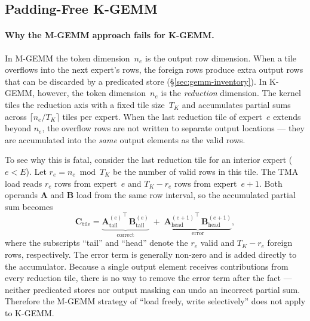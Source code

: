 \documentclass[11pt,a4paper]{article}
\theoremstyle{definition}
\begin{document}
\subsection{Padding-Free K-GEMM}

\paragraph{Why the M-GEMM approach fails for K-GEMM.}
In M-GEMM the token dimension~$n_e$ is the output row dimension.
When a tile overflows into the next expert's rows, the foreign rows
produce extra output rows that can be discarded by a predicated store
(\S\ref{sec:gemm-inventory}).
In K-GEMM, however, the token dimension~$n_e$ is the \emph{reduction}
dimension.
The kernel tiles the reduction axis with a fixed tile size~$T_K$ and
accumulates partial sums across $\lceil n_e / T_K \rceil$ tiles per
expert.
When the last reduction tile of expert~$e$ extends beyond $n_e$,
the overflow rows are not written to separate output locations --- they
are accumulated into the \emph{same} output elements as the valid rows.

To see why this is fatal, consider the last reduction tile for an
interior expert ($e < E$).
Let $r_e = n_e \bmod T_K$ be the number of valid rows in this tile.
The TMA load reads $r_e$ rows from expert~$e$ and $T_K - r_e$
rows from expert~$e{+}1$.
Both operands $\mathbf{A}$ and $\mathbf{B}$ load from the same
row interval, so the accumulated partial sum becomes
\begin{equation}
  \mathbf{C}_{\text{tile}} =
    \underbrace{{\mathbf{A}^{(e)}_{\text{tail}}}^{\!\top}
               \,\mathbf{B}^{(e)}_{\text{tail}}}_{\text{correct}}
    \;+\;
    \underbrace{{\mathbf{A}^{(e+1)}_{\text{head}}}^{\!\top}
               \,\mathbf{B}^{(e+1)}_{\text{head}}}_{\text{error}},
\label{eq:kgemm-contamination}
\end{equation}
where the subscripts ``tail'' and ``head'' denote the $r_e$ valid and
$T_K - r_e$ foreign rows, respectively.
The error term is generally non-zero and is added directly to the
accumulator.
Because a single output element receives contributions from every
reduction tile, there is no way to remove the error term after the
fact --- neither predicated stores nor output masking can undo an
incorrect partial sum.
Therefore the M-GEMM strategy of ``load freely, write selectively''
does not apply to K-GEMM.
\end{document}
